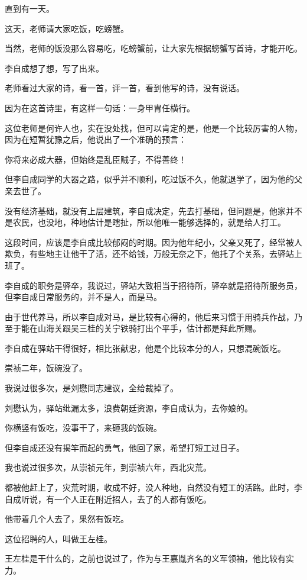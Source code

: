\begin{multicols}{\theparacolNo}
		直到有一天。

		这天，老师请大家吃饭，吃螃蟹。

		当然，老师的饭没那么容易吃，吃螃蟹前，让大家先根据螃蟹写首诗，才能开吃。

		李自成想了想，写了出来。

		老师看过大家的诗，看一首，评一首，看到他写的诗，没有说话。

		因为在这首诗里，有这样一句话：一身甲胄任横行。

		这位老师是何许人也，实在没处找，但可以肯定的是，他是一个比较厉害的人物，因为在短暂犹豫之后，他说出了一个准确的预言：

		你将来必成大器，但始终是乱臣贼子，不得善终！

		但李自成同学的大器之路，似乎并不顺利，吃过饭不久，他就退学了，因为他的父亲去世了。

		没有经济基础，就没有上层建筑，李自成决定，先去打基础，但问题是，他家并不是农民，也没地，种地估计是瞎扯，所以他唯一能够选择的，就是给人打工。

		这段时间，应该是李自成比较郁闷的时期。因为他年纪小，父亲又死了，经常被人欺负，有些地主让他干了活，还不给钱，万般无奈之下，他托了个关系，去驿站上班了。

		李自成的职务是驿卒，我说过，驿站大致相当于招待所，驿卒就是招待所服务员，但李自成日常服务的，并不是人，而是马。

		由于世代养马，所以李自成对马，是比较有心得的，他后来习惯于用骑兵作战，乃至于能在山海关跟吴三桂的关宁铁骑打出个平手，估计都是拜此所赐。

		李自成在驿站干得很好，相比张献忠，他是个比较本分的人，只想混碗饭吃。

		崇祯二年，饭碗没了。

		我说过很多次，是刘懋同志建议，全给裁掉了。

		刘懋认为，驿站纰漏太多，浪费朝廷资源，李自成认为，去你娘的。

		你横竖有饭吃，没事干了，来砸我的饭碗。

		但李自成还没有揭竿而起的勇气，他回了家，希望打短工过日子。

		我也说过很多次，从崇祯元年，到崇祯六年，西北灾荒。

		都被他赶上了，灾荒时期，收成不好，没人种地，自然没有短工的活路。此时，李自成听说，有一个人正在附近招人，去了的人都有饭吃。

		他带着几个人去了，果然有饭吃。

		这位招聘的人，叫做王左桂。

		王左桂是干什么的，之前也说过了，作为与王嘉胤齐名的义军领袖，他比较有实力。


\end{multicols}
